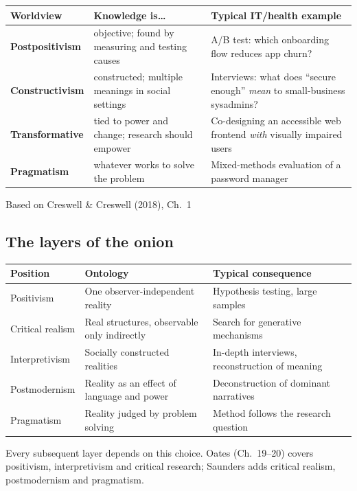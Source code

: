 \documentclass[11pt,a4paper,british,twoside=false,headings=small,chapterprefix=false,numbers=noenddot]{scrbook}
\newcommand{\src}[1]{{\scriptsize\color{uiagrey}#1}}
\newcommand{\onionloc}[7]{}
\begin{document}
\begin{center}\small
\small
  \renewcommand{\arraystretch}{1.35}
  \begin{tabular}{@{}p{2.6cm}p{4.6cm}p{5.6cm}@{}}
    \toprule
    \textbf{Worldview} & \textbf{Knowledge is\dots} & \textbf{Typical IT/health example}\\
    \midrule
    \textcolor{kristiania}{\textbf{Postpositivism}} & objective; found by measuring and testing causes & A/B test: which onboarding flow reduces app churn?\\
    \textcolor{kristiania}{\textbf{Constructivism}} & constructed; multiple meanings in social settings & Interviews: what does ``secure enough'' \emph{mean} to small-business sysadmins?\\
    \textcolor{kristiania}{\textbf{Transformative}} & tied to power and change; research should empower & Co-designing an accessible web frontend \emph{with} visually impaired users\\
    \textcolor{kristiania}{\textbf{Pragmatism}} & whatever works to solve the problem & Mixed-methods evaluation of a password manager\\
    \bottomrule
  \end{tabular}
  

  {\color{kgrey}\small Based on Creswell \& Creswell (2018), Ch.\ 1}
\end{center}


\subsection{The layers of the onion}
\begin{center}\small
\centering
  \footnotesize
  \begin{tabular}{@{}L{2.4cm}L{3.9cm}L{4.6cm}@{}}
    \toprule
    \textbf{Position} & \textbf{Ontology} & \textbf{Typical consequence} \\
    \midrule
    Positivism & One observer-independent reality & Hypothesis testing, large samples \\
    Critical realism & Real structures, observable only indirectly & Search for generative mechanisms \\
    Interpretivism & Socially constructed realities & In-depth interviews, reconstruction of meaning \\
    Postmodernism & Reality as an effect of language and power & Deconstruction of dominant narratives \\
    Pragmatism & Reality judged by problem solving & Method follows the research question \\
    \bottomrule
  \end{tabular}
  \par
  \raggedright
  \src{Every subsequent layer depends on this choice. Oates (Ch.\ 19--20) covers positivism, interpretivism and critical research; Saunders adds critical realism, postmodernism and pragmatism.}
  \onionloc{1}{0}{0}{0}{0}{0}{Layer 1}
\end{center}
\end{document}
